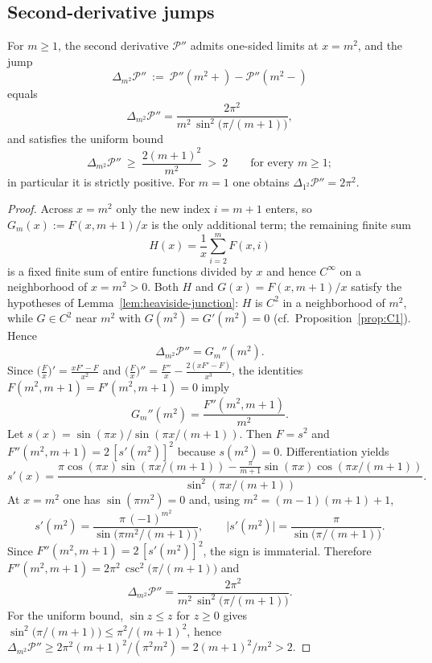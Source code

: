 \subsection{Second-derivative jumps}

\begin{proposition}\label{prop:second}
For $m\ge1$, the second derivative $\mathcal P''$ admits one-sided limits at $x=m^2$, and the jump
\[
\Delta_{m^2}\mathcal P''\ :=\ \mathcal P''(m^2{+})-\mathcal P''(m^2{-})
\]
equals
\[
\Delta_{m^2}\mathcal{P}''=\frac{2\pi^2}{m^2\,\sin^2\!\bigl(\pi/(m+1)\bigr)},
\]
and satisfies the uniform bound
\[
\Delta_{m^2}\mathcal{P}''\ \ge\ \frac{2(m+1)^2}{m^2}\ >\ 2\qquad\text{for every }m\ge1 ;
\]
in particular it is strictly positive. For $m=1$ one obtains $\Delta_{1^2}\mathcal P''=2\pi^2$.
\end{proposition}

\begin{proof}
Across $x=m^2$ only the new index $i=m{+}1$ enters, so $G_m(x):=F(x,m{+}1)/x$ is the only additional term; the remaining finite sum
\[
H(x)=\frac{1}{x}\sum_{i=2}^{m}F(x,i)
\]
is a fixed finite sum of entire functions divided by $x$ and hence $C^\infty$ on a neighborhood of $x=m^2>0$. Both $H$ and $G(x)=F(x,m{+}1)/x$ satisfy the hypotheses of Lemma~\ref{lem:heaviside-junction}: $H$ is $C^2$ in a neighborhood of $m^2$, while $G\in C^2$ near $m^2$ with $G(m^2)=G'(m^2)=0$ (cf.\ Proposition~\ref{prop:C1}). Hence
\[
\Delta_{m^2}\mathcal P''=G_m''(m^2).
\]
Since $\bigl(\tfrac{F}{x}\bigr)'=\frac{xF'-F}{x^2}$ and $\bigl(\tfrac{F}{x}\bigr)''=\frac{F''}{x}-\frac{2(xF'-F)}{x^3}$, the identities $F(m^2,m{+}1)=F'(m^2,m{+}1)=0$ imply
\[
G_m''(m^2)=\frac{F''(m^2,m{+}1)}{m^2}.
\]
Let $s(x)=\sin(\pi x)/\sin(\pi x/(m{+}1))$. Then $F=s^2$ and $F''(m^2,m{+}1)=2\,[s'(m^2)]^2$ because $s(m^2)=0$. Differentiation yields
\[
s'(x)=\frac{\pi\cos(\pi x)\sin(\pi x/(m{+}1))-\frac{\pi}{m{+}1}\sin(\pi x)\cos(\pi x/(m{+}1))}{\sin^2(\pi x/(m{+}1))}.
\]
At $x=m^2$ one has $\sin(\pi m^2)=0$ and, using $m^2=(m-1)(m{+}1)+1$,
\[
s'(m^2)=\frac{\pi\,(-1)^{m^2}}{\sin\!\bigl(\pi m^2/(m{+}1)\bigr)},
\qquad
\bigl|s'(m^2)\bigr|=\frac{\pi}{\sin\!\bigl(\pi/(m{+}1)\bigr)}.
\]
Since $F''(m^2,m{+}1)=2\,[s'(m^2)]^2$, the sign is immaterial.
Therefore $F''(m^2,m{+}1)=2\pi^2\,\csc^2\!\bigl(\pi/(m{+}1)\bigr)$ and
\[
\Delta_{m^2}\mathcal P''=\frac{2\pi^2}{m^2\,\sin^2\!\bigl(\pi/(m{+}1)\bigr)}.
\]
For the uniform bound, $\sin z\le z$ for $z\ge0$ gives $\sin^2\!\bigl(\pi/(m{+}1)\bigr)\le\pi^2/(m{+}1)^2$, hence $\Delta_{m^2}\mathcal P''\ge 2\pi^2(m{+}1)^2/(\pi^2m^2)=2(m{+}1)^2/m^2>2$.
\end{proof}


